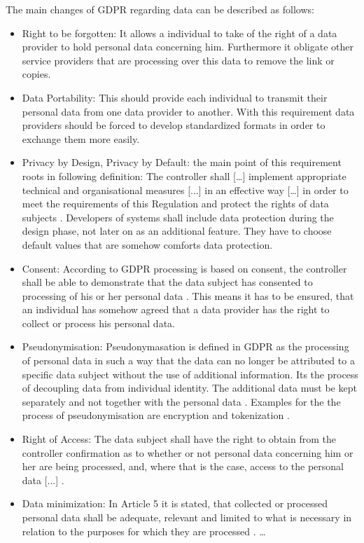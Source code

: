 The main changes of GDPR regarding data can be described as follows:
\begin{itemize}  
\item Right to be forgotten:  It allows a individual to take of the right of a data provider to hold personal data concerning him. Furthermore it obligate other service providers that are processing over this data to remove the link or copies.
\item Data Portability: This should provide each individual to transmit their personal data from one data provider to another. With this requirement data providers should be forced to develop standardized formats in order to exchange them more easily.
\item Privacy by Design, Privacy by Default: the main point of this requirement roots in following definition: The controller shall […] implement appropriate technical and organisational measures [...] in an effective way […] in order to meet the requirements of this Regulation and protect the rights of data subjects \cite{gdpr}. Developers of systems shall include data protection during the design phase, not later on as an additional feature. They have to choose default values that are somehow comforts data protection. 
\item Consent: According to GDPR processing is based on consent, the controller shall be able to demonstrate that the data subject has consented to processing of his or her personal data \citep{gdpr} . This means it has to be ensured, that an individual has somehow agreed that a data provider has the right to collect or process his personal data. 
\item Pseudonymisation: Pseudonymasation is defined in GDPR as the processing of personal data in such a way that the data can no longer be attributed to a specific data subject without the use of additional information. Its the process of decoupling data from individual identity. The additional data must be kept separately and not together with the personal data \cite{pseudonym}. Examples for the the process of pseudonymisation are encryption and tokenization \cite{pseudoExample}.
\item Right of Access: The data subject shall have the right to obtain from the controller confirmation as to whether or not personal data concerning him or her are being processed, and, where that is the case, access to the personal data [...]\citep{gdpr} .
\item Data minimization: In Article 5 it is stated, that collected or processed personal data shall be adequate, relevant and limited to what is necessary in relation to the purposes for which they are processed \citep{gdpr} .
 \ldots 
\end{itemize}

